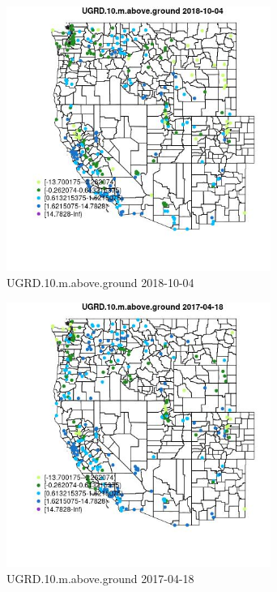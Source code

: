 \begin{figure} 
\centering  
\includegraphics[width=0.77\textwidth]{Code_Outputs/Report_ML_input_PM25_Step4_part_f_de_duplicated_aveswNAs_MapObsUGRD10maboveground2018-10-04.jpg} 
\caption{\label{fig:Report_ML_input_PM25_Step4_part_f_de_duplicated_aveswNAsMapObsUGRD10maboveground2018-10-04}UGRD.10.m.above.ground 2018-10-04} 
\end{figure} 
 

\begin{figure} 
\centering  
\includegraphics[width=0.77\textwidth]{Code_Outputs/Report_ML_input_PM25_Step4_part_f_de_duplicated_aveswNAs_MapObsUGRD10maboveground2017-04-18.jpg} 
\caption{\label{fig:Report_ML_input_PM25_Step4_part_f_de_duplicated_aveswNAsMapObsUGRD10maboveground2017-04-18}UGRD.10.m.above.ground 2017-04-18} 
\end{figure} 
 

